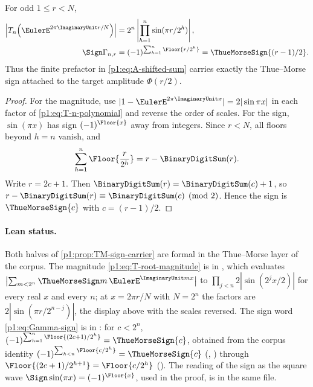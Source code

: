 \documentclass[11pt,oneside]{article}
\theoremstyle{definition}
\theoremstyle{remark}
\newcommand{\PhiU}{\Phi}
\begin{document}
\begin{proposition}\label{p1:prop:TM-sign-carrier}
For odd $1\le r<N$,
\begin{align}
 \left|T_n\!\left(\EulerE^{2\pi\ImaginaryUnit r/N}\right)\right|
 &=2^n\left|\prod_{h=1}^{n}\sin(\pi r/2^h)\right|,
 \label{p1:eq:T-root-magnitude}\\
 \Sign \Gamma_{n,r}
 &=(-1)^{\sum_{h=1}^{n}\Floor{r/2^h}}
 =\ThueMorseSign{(r-1)/2}.
 \label{p1:eq:Gamma-sign}
\end{align}
Thus the finite prefactor in \eqref{p1:eq:A-shifted-sum} carries exactly the
Thue--Morse sign attached to the target amplitude $\PhiU(r/2)$.
\end{proposition}

\begin{proof}
For the magnitude, use $|1-\EulerE^{2\pi\ImaginaryUnit x}|=2|\sin\pi x|$ in each factor of
\eqref{p1:eq:T-n-polynomial} and reverse the order of scales.  For the sign,
$\sin(\pi x)$ has sign $(-1)^{\Floor{x}}$ away from integers.  Since
$r<N$, all floors beyond $h=n$ vanish, and
\[
 \sum_{h=1}^{n}\Floor{\frac r{2^h}}
 =r-\BinaryDigitSum(r).
\]
Write $r=2c+1$.  Then $\BinaryDigitSum(r)=\BinaryDigitSum(c)+1$, so
$r-\BinaryDigitSum(r)\equiv \BinaryDigitSum(c)\pmod2$.  Hence the sign is $\ThueMorseSign{c}$ with
$c=(r-1)/2$.
\end{proof}

\paragraph{Lean status.}
Both halves of \cref{p1:prop:TM-sign-carrier} are formal in the Thue--Morse layer of the
corpus.  The magnitude \eqref{p1:eq:T-root-magnitude} is
 in , which evaluates
$\bigl|\sum_{m<2^n}\ThueMorseSign m\,\EulerE^{\ImaginaryUnit mx}\bigr|$ to
$\prod_{j<n}2|\sin(2^jx/2)|$ for every real $x$ and every $n$; at $x=2\pi r/N$ with
$N=2^n$ the factors are $2|\sin(\pi r/2^{n-j})|$, the display above with the scales
reversed.  The sign word \eqref{p1:eq:Gamma-sign} is
 in :
for $c<2^n$, $(-1)^{\sum_{h=1}^{n}\Floor{(2c+1)/2^h}}=\ThueMorseSign{c}$, obtained from the
corpus identity $(-1)^{\sum_{h<n}\Floor{c/2^h}}=\ThueMorseSign{c}$
(,
) through $\Floor{(2c+1)/2^{h+1}}=\Floor{c/2^h}$
().  The reading of the sign as the
square wave $\Sign\sin(\pi x)=(-1)^{\Floor{x}}$, used in the proof, is
 in the same file.
\end{document}
